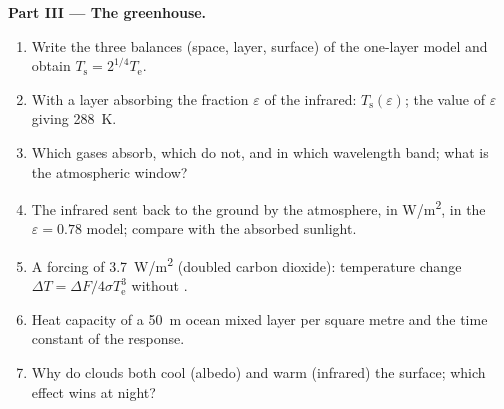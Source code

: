 \begin{problem}
\textbf{Part III --- The greenhouse.}
\begin{enumerate}[resume]
  \item Write the three balances (space, layer, surface) of the
        one-layer model and obtain $T_{\text{s}} = 2^{1/4}T_{\text{e}}$.
  \item With a layer absorbing the fraction $\varepsilon$ of the
        infrared: $T_{\text{s}}(\varepsilon)$; the value of $\varepsilon$
        giving \qty{288}{K}.
  \item Which gases absorb, which do not, and in which wavelength
        band; what is the atmospheric window?
  \item The infrared sent back to the ground by the atmosphere,
        in \unit{W/m^2}, in the $\varepsilon = 0.78$ model; compare with
        the absorbed sunlight.
  \item A forcing of \qty{3.7}{W/m^2} (doubled carbon dioxide):
        temperature change $\Delta T = \Delta F/4\sigma T_{\text{e}}^3$
        without .
  \item Heat capacity of a \qty{50}{m} ocean mixed layer per square
        metre and the time constant of the response.
  \item Why do clouds both cool (albedo) and warm (infrared) the
        surface; which effect wins at night?
\end{enumerate}


\end{problem}
